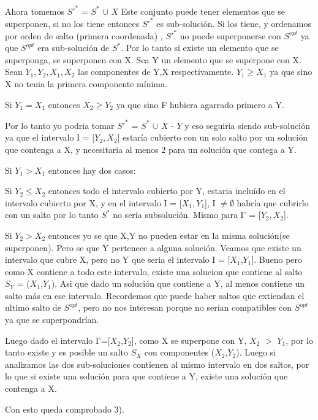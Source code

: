 Ahora tomemos $S'^{*}$ = $S^{*}$ $\cup$ ${X}$
Este conjunto puede tener elementos que se superponen, si no los tiene entonces 
$S'^{*}$ es sub-soluci\'on.
Si los tiene, y ordenamos por orden de salto (primera coordenada) , $S'^{*}$ no puede superponerse con $S^{opt}$ ya que $S^{opt}$ era sub-soluci\'on de $S^{*}$.
Por lo tanto si existe un elemento que se superponga, se superponen con X.
Sea Y un elemento que se superpone con X.
Sean $Y_{1},Y_{2},X_{1},X_{2}$ las componentes de Y,X respectivamente.
$Y_{1}\geq X_{1}$ ya que sino X no tenia la primera componente m\'inima.

Si $Y_{1} = X_{1}$ entonces $X_{2} \geq Y_{2}$ ya que sino F hubiera agarrado primero a Y. 

Por lo tanto yo podria tomar $S'^{*}$ = $S^{*}$ $\cup$ ${X}$ - ${Y}$ y eso seguiria siendo sub-soluci\'on ya que el intervalo I = [$Y_{2},X_{2}$] estar\'ia cubierto con un solo salto por un soluci\'on que contenga a X, y necesitaria al menos 2 para un soluci\'on que contega a Y.

Si $Y_{1} > X_{1}$ entonces hay dos casos:

Si $Y_{2} \leq X_{2}$ entonces todo el intervalo cubierto por Y, estaria inclu\'ido en el intervalo cubierto por X, y en el intervalo I = [$X_{1},Y_{1}$], I $\neq \emptyset$ habr\'ia que cubrirlo con un salto por lo tanto $S^{*}$ no ser\'ia subsoluci\'on. Mismo para I' =  [$Y_{2},X_{2}$].

Si $Y_{2} > X_{2}$ entonces yo se que X,Y no pueden estar en la misma soluci\'on(se superponen). Pero se que Y pertenece a alguna soluci\'on. Veamos que existe un intervalo que cubre X, pero no Y que seria el intervalo I = [$X_{1}$,$Y_{1}$].
Bueno pero como X contiene a todo este intervalo, existe una solucion que contiene al salto $S_{Y}$ = ($X_{1}$,$Y_{1}$). Asi que dado un soluci\'on que contiene a Y, al menos contiene un salto m\'as en ese intervalo. Recordemos que puede haber saltos que extiendan el ultimo salto de $S^{opt}$, pero no nos interesan porque no ser\'ian compatibles con $S^{opt}$ ya que se superpondr\'ian.
 
Luego dado el intervalo I'=[$X_{2}$,$Y_{2}$], como X se superpone con Y, $X_{2}$ $>$ $Y_{1}$, por lo tanto existe y es posible un salto $S_{X}$ con componentes ($X_{2}$,$Y_{2}$).
Luego si analizamos las dos sub-soluciones contienen al mismo intervalo en dos saltos, por lo que si existe una soluci\'on para que contiene a Y, existe una soluci\'on que contenga a X. 

Con esto queda comprobado 3).

